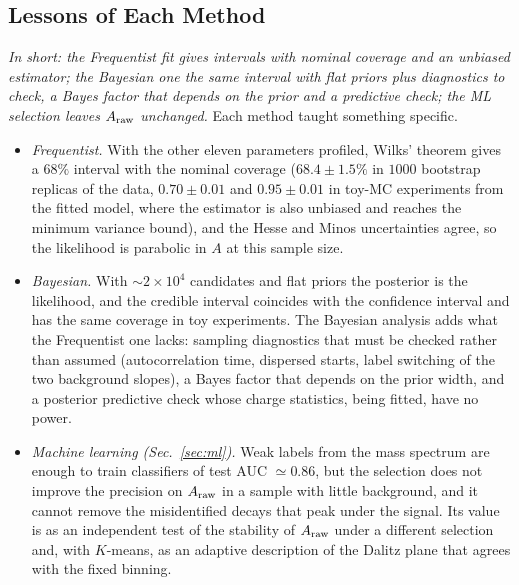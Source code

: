\subsection{Lessons of Each Method}
\emph{In short: the Frequentist fit gives intervals with nominal coverage and an unbiased estimator; the Bayesian one the same interval with flat priors plus diagnostics to check, a Bayes factor that depends on the prior and a predictive check; the ML selection leaves $A_{\mathrm{raw}}$ unchanged.}
Each method taught something specific.
\begin{itemize}[leftmargin=*,itemsep=2pt]
\item \emph{Frequentist.} With the other eleven parameters profiled, Wilks' theorem gives a $68\%$ interval with the nominal coverage ($68.4\pm1.5\%$ in $1000$ bootstrap replicas of the data, $0.70\pm0.01$ and $0.95\pm0.01$ in toy-MC experiments from the fitted model, where the estimator is also unbiased and reaches the minimum variance bound), and the Hesse and Minos uncertainties agree, so the likelihood is parabolic in $A$ at this sample size.
\item \emph{Bayesian.} With $\sim2\times10^4$ candidates and flat priors the posterior is the likelihood, and the credible interval coincides with the confidence interval and has the same coverage in toy experiments. The Bayesian analysis adds what the Frequentist one lacks: sampling diagnostics that must be checked rather than assumed (autocorrelation time, dispersed starts, label switching of the two background slopes), a Bayes factor that depends on the prior width, and a posterior predictive check whose charge statistics, being fitted, have no power.
\item \emph{Machine learning (Sec.~\ref{sec:ml}).} Weak labels from the mass spectrum are enough to train classifiers of test AUC $\simeq0.86$, but the selection does not improve the precision on $A_{\mathrm{raw}}$ in a sample with little background, and it cannot remove the misidentified decays that peak under the signal. Its value is as an independent test of the stability of $A_{\mathrm{raw}}$ under a different selection and, with $K$-means, as an adaptive description of the Dalitz plane that agrees with the fixed binning.
\end{itemize}
